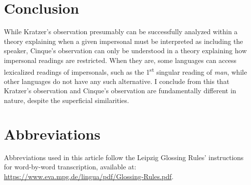\documentclass[output=paper]{LSP/langsci}
\begin{document}
\section{Conclusion}\label{sec:egerland:5}
While Kratzer’s observation presumably can be successfully analyzed within a theory explaining when a given impersonal must be interpreted as including the speaker, Cinque’s observation can only be understood in a theory explaining how impersonal readings are restricted. When they are, some languages can access lexicalized readings of impersonals, such as the 1\textsuperscript{st} singular reading of  \textit{man}, while other languages do not have any such alternative. I conclude from this that Kratzer’s observation and Cinque’s observation are fundamentally different in nature, despite the superficial similarities.

\section*{Abbreviations}
Abbreviations used in this article follow the Leipzig Glossing Rules’ instructions for word-by-word transcription, available at: \url{https://www.eva.mpg.de/lingua/pdf/Glossing-Rules.pdf}.
{\sloppy
\printbibliography[heading=subbibliography,notkeyword=this]
} 
\end{document}
